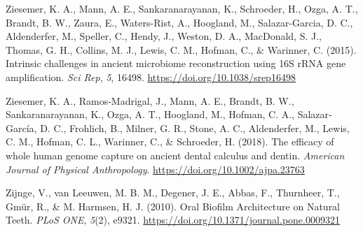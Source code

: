 \documentclass[
  letterpaper,
]{book}
\newlength{\cslhangindent}
\newlength{\cslentryspacingunit} %
\newenvironment{CSLReferences}[2] %
 {%
  \setlength{\parindent}{0pt}
  \ifodd #1
  \let\oldpar\par
  \def\par{\hangindent=\cslhangindent\oldpar}
  \fi
  \setlength{\parskip}{#2\cslentryspacingunit}
 }%
 {}
\begin{document}
\begin{CSLReferences}{1}{0}
\leavevmode{}%
Ziesemer, K. A., Mann, A. E., Sankaranarayanan, K., Schroeder, H., Ozga,
A. T., Brandt, B. W., Zaura, E., Waters-Rist, A., Hoogland, M.,
Salazar-Garcia, D. C., Aldenderfer, M., Speller, C., Hendy, J., Weston,
D. A., MacDonald, S. J., Thomas, G. H., Collins, M. J., Lewis, C. M.,
Hofman, C., \& Warinner, C. (2015). Intrinsic challenges in ancient
microbiome reconstruction using {16S rRNA} gene amplification. \emph{Sci
Rep}, \emph{5}, 16498. \url{https://doi.org/10.1038/srep16498}

\leavevmode{}%
Ziesemer, K. A., Ramos‐Madrigal, J., Mann, A. E., Brandt, B. W.,
Sankaranarayanan, K., Ozga, A. T., Hoogland, M., Hofman, C. A.,
Salazar‐García, D. C., Frohlich, B., Milner, G. R., Stone, A. C.,
Aldenderfer, M., Lewis, C. M., Hofman, C. L., Warinner, C., \&
Schroeder, H. (2018). The efficacy of whole human genome capture on
ancient dental calculus and dentin. \emph{American Journal of Physical
Anthropology}. \url{https://doi.org/10.1002/ajpa.23763}

\leavevmode{}%
Zijnge, V., van Leeuwen, M. B. M., Degener, J. E., Abbas, F., Thurnheer,
T., Gmür, R., \& M. Harmsen, H. J. (2010). Oral {Biofilm Architecture}
on {Natural Teeth}. \emph{PLoS ONE}, \emph{5}(2), e9321.
\url{https://doi.org/10.1371/journal.pone.0009321}

\end{CSLReferences}

\backmatter
\end{document}

